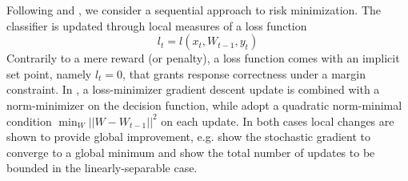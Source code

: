 \documentclass[preprint,12pt,authoryear]{elsarticle}
\begin{document}
Following   \cite{kivinen2004online} and \cite{crammer2006online}, we consider a sequential approach to risk minimization.
The classifier is updated through local measures of a loss function $$l_t = l(x_t,W_{t-1},y_t)$$
 Contrarily to a mere reward (or penalty), a loss function comes with an implicit set point, namely $l_t=0$, that grants response correctness under a margin constraint. In \cite{kivinen2004online}, a loss-minimizer gradient descent update is combined with a norm-minimizer on the decision function, while \cite{crammer2006online} adopt a quadratic norm-minimal condition $\min_W ||W - W_{t-1}||^2$ on each update. In both cases local changes are shown to provide global improvement, e.g. \cite{kivinen2004online} show the stochastic gradient to converge to a global minimum and \cite{crammer2006online} show the total number of updates to be bounded in the linearly-separable case.

\end{document}

